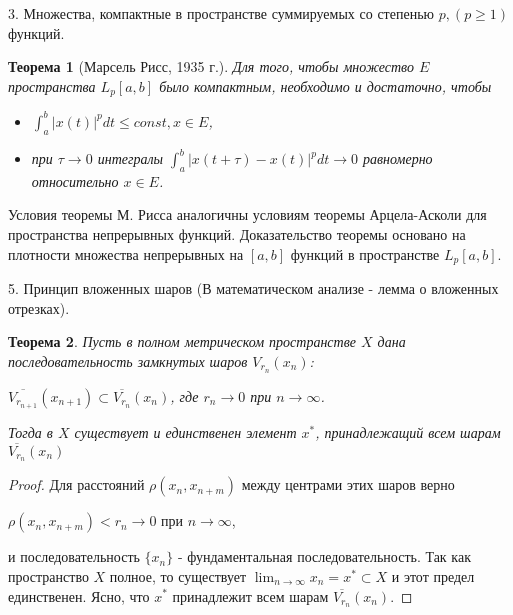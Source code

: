\documentclass[12pt,a4paper,titlepage]{book}
\theoremstyle{definition}
\theoremstyle{plain}
\newtheorem*{theorem}{Теорема}
\theoremstyle{remark}
\theoremstyle{remark}
\theoremstyle{remark}
\theoremstyle{plain}
\begin{document}
3. Множества, компактные в пространстве суммируемых со степенью $p, (p \geq 1)$ функций.

\begin{theorem} [Марсель Рисс, 1935 г.]
Для того, чтобы множество $E$  пространства $L_p[a, b]$ было компактным, необходимо и достаточно, чтобы

\begin{itemize}

\item $\int_{a}^{b} |x(t)|^p dt \leq const, x \in E$,

\item при $\tau \rightarrow 0$ интегралы $\int_{a}^{b} |x(t+\tau)-x(t)|^p dt \rightarrow 0$ равномерно относительно $x \in E$.

\end{itemize}


\end{theorem}

Условия теоремы М. Рисса аналогичны условиям теоремы Арцела-Асколи для пространства непрерывных функций. Доказательство теоремы основано на плотности множества непрерывных на $[a, b]$ функций в пространстве $L_p [a, b]$.

5. Принцип вложенных шаров (В математическом анализе - лемма о вложенных отрезках).

\begin{theorem} Пусть в полном метрическом пространстве $X$ дана последовательность замкнутых шаров $V_{r_n}(x_n)$:
\begin{center}
$\overline{V_{r_{n+1}}}(x_{n+1})\subset \overline{V_{r_{n}}}(x_n)$, где $r_n \rightarrow 0$ при $n \rightarrow \infty$.

\end{center}

Тогда в $X$ существует и единственен элемент $x^{*}$, принадлежащий всем шарам $\overline{V_{r_{n}}}(x_n)$

\end{theorem}

\begin{proof} Для расстояний $\rho(x_n, x_{n+m})$ между центрами этих шаров верно 
\begin{center}
$\rho(x_n, x_{n+m})<r_n \rightarrow 0$  при $n \rightarrow \infty$,
\end{center}
и последовательность $\{x_n\}$ - фундаментальная последовательность. Так как пространство $X$ полное, то существует $\displaystyle\lim_{n\rightarrow \infty} x_n=x^{*} \subset X$ и этот предел единственен. Ясно, что $x^{*}$ принадлежит всем шарам $\overline{V_{r_{n}}}(x_n)$.
	
\end{proof}
\end{document}

